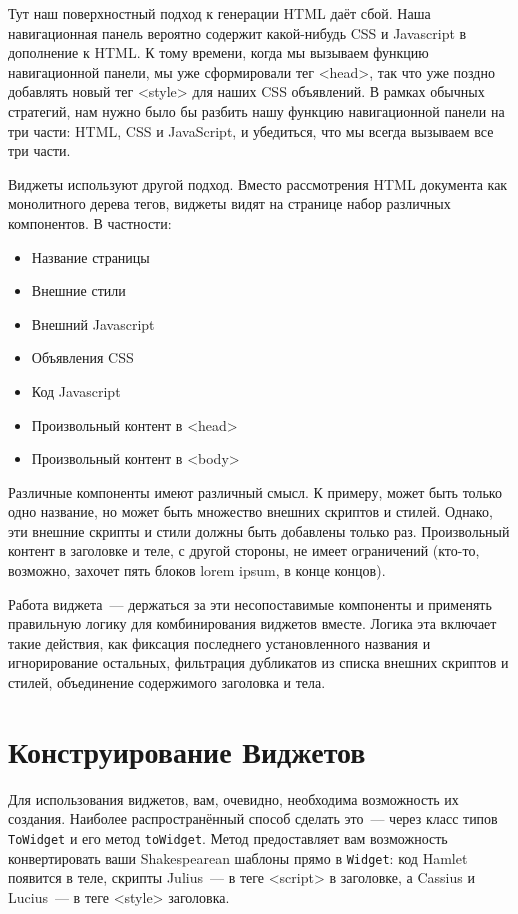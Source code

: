 Тут наш поверхностный подход к генерации HTML даёт сбой. Наша навигационная
панель вероятно содержит какой-нибудь CSS и Javascript в дополнение к HTML. К
тому времени, когда мы вызываем функцию навигационной панели, мы уже
сформировали тег <head>, так что уже поздно добавлять новый тег <style> для
наших CSS объявлений. В рамках обычных стратегий, нам нужно было бы разбить
нашу функцию навигационной панели на три части: HTML, CSS и JavaScript, и
убедиться, что мы всегда вызываем все три части.

Виджеты используют другой подход. Вместо рассмотрения HTML документа как
монолитного дерева тегов, виджеты видят на странице набор различных
компонентов. В частности:
\begin{itemize}
    \item Название страницы
    \item Внешние стили
    \item Внешний Javascript
    \item Объявления CSS
    \item Код Javascript
    \item Произвольный контент в <head>
    \item Произвольный контент в <body>
\end{itemize}

Различные компоненты имеют различный смысл. К примеру, может быть только одно
название, но может быть множество внешних скриптов и стилей. Однако, эти
внешние скрипты и стили должны быть добавлены только раз. Произвольный контент
в заголовке и теле, с другой стороны, не имеет ограничений (кто-то, возможно,
захочет пять блоков lorem ipsum, в конце концов).

Работа виджета~--- держаться за эти несопоставимые компоненты и применять
правильную логику для комбинирования виджетов вместе. Логика эта включает такие
действия, как фиксация последнего установленного названия и игнорирование
остальных, фильтрация дубликатов из списка внешних скриптов и стилей,
объединение содержимого заголовка и тела.

\section{Конструирование Виджетов}
Для использования виджетов, вам, очевидно, необходима возможность их создания.
Наиболее распространённый способ сделать это~--- через класс типов
\lstinline'ToWidget' и его метод \lstinline'toWidget'. Метод предоставляет вам
возможность конвертировать ваши Shakespearean шаблоны прямо в
\lstinline'Widget': код Hamlet появится в теле, скрипты Julius~--- в теге
<script> в заголовке, а Cassius и Lucius~--- в теге <style> заголовка.

